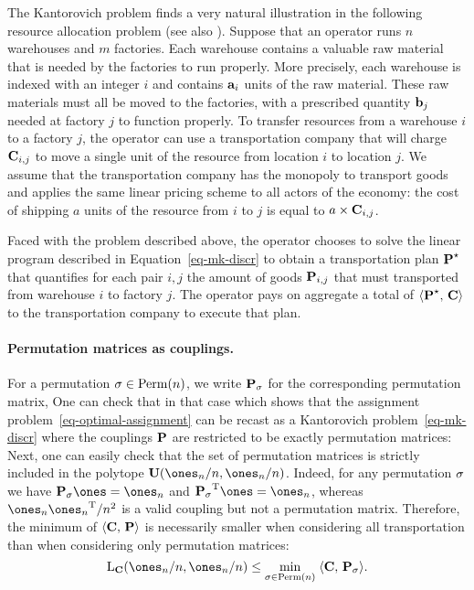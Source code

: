 \begin{rem}\label{rem-kantorovich-primal} The Kantorovich problem finds a very natural illustration in the following resource allocation problem (see also \citet{Hitchcock41}). Suppose that an operator runs $n$ warehouses and $m$ factories. Each warehouse contains a valuable raw material that is needed by the factories to run properly. More precisely, each warehouse is indexed with an integer $i$ and contains $\a_i$ units of the raw material. These raw materials must all be moved to the factories, with a prescribed quantity $\b_j$ needed at factory $j$ to function properly. To transfer resources from a warehouse $i$ to a factory $j$, the operator can use a transportation company that will charge $\C_{i,j}$ to move a single unit of the resource from location $i$ to location $j$. We assume that the transportation company has the monopoly to transport goods and applies the same linear pricing scheme to all actors of the economy: the cost of shipping $a$ units of the resource from $i$ to $j$ is equal to $a\times \C_{i,j}$.

Faced with the problem described above, the operator chooses to solve the linear program described in Equation~\eqref{eq-mk-discr} to obtain a transportation plan $\P^\star$ that quantifies for each pair $i,j$ the amount of goods $\P_{i,j}$ that must transported from warehouse $i$ to factory $j$. The operator pays on aggregate a total of $\dotp{\P^\star}{\C}$ to the transportation company to execute that plan.
\end{rem}

\paragraph{Permutation matrices as couplings.}

For a permutation $\si\in\Perm(n)$, we write $\P_{\si}$ for the corresponding permutation matrix,
One can check that in that case
which shows that the assignment problem~\eqref{eq-optimal-assignment} can be recast as a Kantorovich problem~\eqref{eq-mk-discr} where the couplings $\P$ are restricted to be exactly permutation matrices:
Next, one can easily check that the set of permutation matrices is strictly included in the \citeauthor{birkhoff} polytope $\CouplingsD(\ones_n/n,\ones_n/n)$. Indeed, for any permutation $\si$ we have $\P_{\si}\ones=\ones_n$ and $\transp{\P_{\si}}\ones=\ones_n$, whereas $\ones_n\transp{\ones_n}/n^2$ is a valid coupling but not a permutation matrix. Therefore, the minimum of $\dotp{\C}{\P}$ is necessarily smaller when considering all transportation than when considering only permutation matrices:
$$ \MKD_{\C}(\ones_n/n,\ones_n/n) \leq \umin{\si \in \Perm(n)} \dotp{\C}{\P_{\si}}.$$

